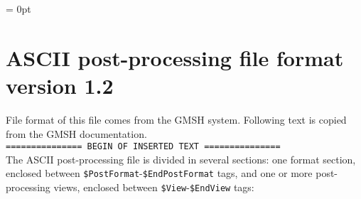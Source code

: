 
\parindent = 0pt

\section*{ASCII post-processing file format version 1.2}
File format of this file comes from the GMSH system. 
Following text is copied from the GMSH documentation.\\[0.5em]

{\tt =============== BEGIN OF INSERTED TEXT ===============}\\[0.3em] 

The ASCII post-processing file is divided in several sections: one format
section, enclosed between {\tt \$PostFormat}-{\tt \$EndPostFormat} tags, and
one or more post-processing views, enclosed between
{\tt \$View}-{\tt \$EndView} tags:

